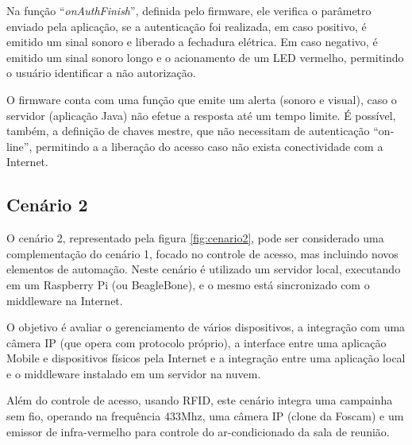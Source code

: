 Na função ``\emph{onAuthFinish}'', definida pelo firmware, ele verifica
o parâmetro enviado pela aplicação, se a autenticação foi realizada,
em caso positivo, é emitido um sinal sonoro e liberado a fechadura
elétrica. Em caso negativo, é emitido um sinal sonoro longo e o acionamento
de um LED vermelho, permitindo o usuário identificar a não autorização.

O firmware conta com uma função que emite um alerta (sonoro e visual),
caso o servidor (aplicação Java) não efetue a resposta até um tempo
limite. É possível, também, a definição de chaves mestre, que não
necessitam de autenticação ``on-line'', permitindo a a liberação
do acesso caso não exista conectividade com a Internet.


\subsection{Cenário 2}

O cenário 2, representado pela figura \ref{fig:cenario2}, pode ser
considerado uma complementação do cenário 1, focado no controle de
acesso, mas incluindo novos elementos de automação. Neste cenário
é utilizado um servidor local, executando em um Raspberry Pi (ou BeagleBone),
e o mesmo está sincronizado com o middleware na Internet. 

O objetivo é avaliar o gerenciamento de vários dispositivos, a integração
com uma câmera IP (que opera com protocolo próprio), a interface entre
uma aplicação Mobile e dispositivos físicos pela Internet e a integração
entre uma aplicação local e o middleware instalado em um servidor
na nuvem.

Além do controle de acesso, usando RFID, este cenário integra uma
campainha sem fio, operando na frequência 433Mhz, uma câmera IP (clone
da Foscam) e um emissor de infra-vermelho para controle do ar-condicionado
da sala de reunião. 


